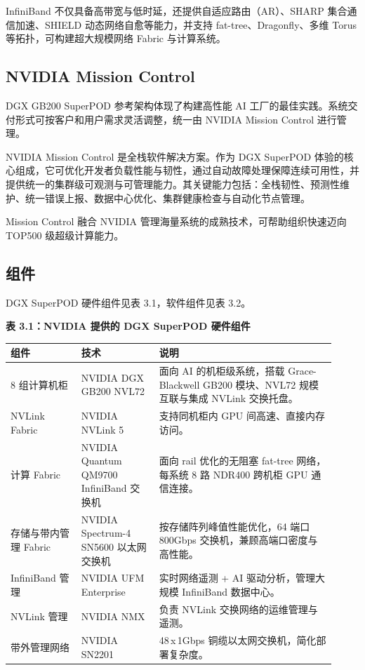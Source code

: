 \documentclass[10pt]{article}
\newcounter{none}
\begin{document}
InfiniBand 不仅具备高带宽与低时延，还提供自适应路由（AR）、SHARP 集合通信加速、SHIELD 动态网络自愈等能力，并支持 fat-tree、Dragonfly、多维 Torus 等拓扑，可构建超大规模网络 Fabric 与计算系统。

\subsection{NVIDIA Mission Control}
DGX GB200 SuperPOD 参考架构体现了构建高性能 AI 工厂的最佳实践。系统交付形式可按客户和用户需求灵活调整，统一由 NVIDIA Mission Control 进行管理。

NVIDIA Mission Control 是全栈软件解决方案。作为 DGX SuperPOD 体验的核心组成，它可优化开发者负载性能与韧性，通过自动故障处理保障连续可用性，并提供统一的集群级可观测与可管理能力。其关键能力包括：全栈韧性、预测性维护、统一错误上报、数据中心优化、集群健康检查与自动化节点管理。

Mission Control 融合 NVIDIA 管理海量系统的成熟技术，可帮助组织快速迈向 TOP500 级超级计算能力。

\subsection{组件}
DGX SuperPOD 硬件组件见表 3.1，软件组件见表 3.2。

\textbf{表 3.1：NVIDIA 提供的 DGX SuperPOD 硬件组件}

{\def\LTcaptype{none}
\begin{longtable}{|p{0.2\linewidth}|p{0.22\linewidth}|p{0.5\linewidth}|}
\hline
\textbf{组件} & \textbf{技术} & \textbf{说明} \\
\hline
8 组计算机柜 & NVIDIA DGX GB200 NVL72 & 面向 AI 的机柜级系统，搭载 Grace-Blackwell GB200 模块、NVL72 规模互联与集成 NVLink 交换托盘。 \\
\hline
NVLink Fabric & NVIDIA NVLink 5 & 支持同机柜内 GPU 间高速、直接内存访问。 \\
\hline
计算 Fabric & NVIDIA Quantum QM9700 InfiniBand 交换机 & 面向 rail 优化的无阻塞 fat-tree 网络，每系统 8 路 NDR400 跨机柜 GPU 通信连接。 \\
\hline
存储与带内管理 Fabric & NVIDIA Spectrum-4 SN5600 以太网交换机 & 按存储阵列峰值性能优化，64 端口 800Gbps 交换机，兼顾高端口密度与高性能。 \\
\hline
InfiniBand 管理 & NVIDIA UFM Enterprise & 实时网络遥测 + AI 驱动分析，管理大规模 InfiniBand 数据中心。 \\
\hline
NVLink 管理 & NVIDIA NMX & 负责 NVLink 交换网络的运维管理与遥测。 \\
\hline
带外管理网络 & NVIDIA SN2201 & 48\,x\,1Gbps 铜缆以太网交换机，简化部署复杂度。 \\
\hline
\end{longtable}
}
\end{document}
